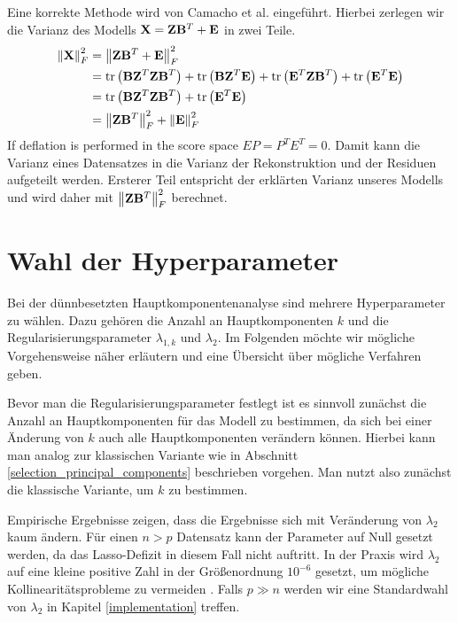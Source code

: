 Eine korrekte Methode wird von Camacho et al. eingeführt. Hierbei zerlegen wir die Varianz des Modells $\mathbf{X} = \mathbf{Z} \mathbf{B}^T + \mathbf{E}$ in zwei Teile.
\begin{align}
\label{camacho_explained_variance}
\left\lVert \mathbf{X} \right\rVert_F^2 & = \left\lVert \mathbf{Z} \mathbf{B}^T + \mathbf{E} \right\rVert_{F}^{2} \nonumber\\
& = \text{tr} \left( \mathbf{B} \mathbf{Z}^T \mathbf{Z} \mathbf{B}^T \right) + \text{tr} \left( \mathbf{B} \mathbf{Z}^T \mathbf{E} \right) + \text{tr} \left( \mathbf{E}^T\mathbf{Z} \mathbf{B}^T \right) + \text{tr} \left( \mathbf{E}^T \mathbf{E} \right) \nonumber\\
& = \text{tr} \left( \mathbf{B} \mathbf{Z}^T \mathbf{Z} \mathbf{B}^T \right) + \text{tr} \left( \mathbf{E}^T \mathbf{E} \right) \nonumber\\
& = \left\lVert \mathbf{Z} \mathbf{B}^T \right\rVert_{F}^{2} + \left\lVert \mathbf{E} \right\rVert_{F}^{2}
\end{align}
If deflation is performed in the score space $EP = P^T E^T = 0$.
Damit kann die Varianz eines Datensatzes in die Varianz der Rekonstruktion und der Residuen aufgeteilt werden. Ersterer Teil entspricht der erklärten Varianz unseres Modells und wird daher mit $\left\lVert \mathbf{Z} \mathbf{B}^T \right\rVert_{F}^{2}$ berechnet.



\section{Wahl der Hyperparameter}
\label{choice_of_tuning_parameters}

Bei der dünnbesetzten Hauptkomponentenanalyse sind mehrere Hyperparameter zu wählen. Dazu gehören die Anzahl an Hauptkomponenten $k$ und die Regularisierungsparameter $\lambda_{1,k}$ und $\lambda_2$. Im Folgenden möchte wir mögliche Vorgehensweise näher erläutern und eine Übersicht über mögliche Verfahren geben. 

Bevor man die Regularisierungsparameter festlegt ist es sinnvoll zunächst die Anzahl an Hauptkomponenten für das Modell zu bestimmen, da sich bei einer Änderung von $k$ auch alle Hauptkomponenten verändern können. Hierbei kann man analog zur klassischen Variante wie in Abschnitt \ref{selection_principal_components} beschrieben vorgehen. Man nutzt also zunächst die klassische Variante, um $k$ zu bestimmen.

Empirische Ergebnisse zeigen, dass die Ergebnisse sich mit Veränderung von $\lambda_2$ kaum ändern. Für einen $n > p$ Datensatz kann der Parameter auf Null gesetzt werden, da das Lasso-Defizit in diesem Fall nicht auftritt. In der Praxis wird $\lambda_2$ auf eine kleine positive Zahl in der Größenordnung $10^{-6}$ gesetzt, um mögliche Kollinearitätsprobleme zu vermeiden \cite{zou_sparsepca}. Falls $p \gg n$ werden wir eine Standardwahl von $\lambda_2$ in Kapitel \ref{implementation} treffen.

